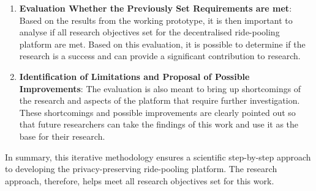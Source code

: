 \begin{enumerate}
    \item \textbf{Evaluation Whether the Previously Set Requirements are met}: 
    Based on the results from the working prototype, it is then important to analyse if all research objectives set for the decentralised ride-pooling platform are met. Based on this evaluation, it is possible to determine if the research is a success and can provide a significant contribution to research.

    \item \textbf{Identification of Limitations and Proposal of Possible Improvements}:
    The evaluation is also meant to bring up shortcomings of the research and aspects of the platform that require further investigation. These shortcomings and possible improvements are clearly pointed out so that future researchers can take the findings of this work and use it as the base for their research.

\end{enumerate}

In summary, this iterative methodology ensures a scientific step-by-step approach to developing the  privacy-preserving ride-pooling platform. The research approach, therefore, helps meet all research objectives set for this work.